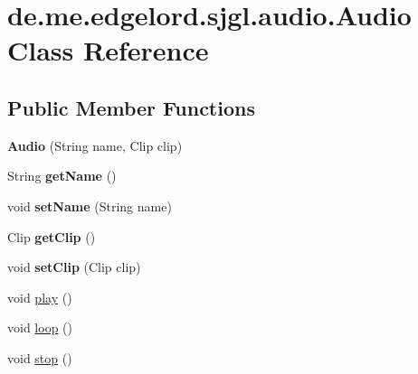 \hypertarget{classde_1_1me_1_1edgelord_1_1sjgl_1_1audio_1_1_audio}{}\section{de.\+me.\+edgelord.\+sjgl.\+audio.\+Audio Class Reference}
\label{classde_1_1me_1_1edgelord_1_1sjgl_1_1audio_1_1_audio}
\subsection*{Public Member Functions}
\begin{DoxyCompactItemize}
\item 
\mbox{\label{classde_1_1me_1_1edgelord_1_1sjgl_1_1audio_1_1_audio_a13ee311071d7068e5ae7997b0266a3c5}} 
{\bfseries Audio} (String name, Clip clip)
\item 
\mbox{\label{classde_1_1me_1_1edgelord_1_1sjgl_1_1audio_1_1_audio_a4b34b06bc7440c084249ae098eb8fe06}} 
String {\bfseries get\+Name} ()
\item 
\mbox{\label{classde_1_1me_1_1edgelord_1_1sjgl_1_1audio_1_1_audio_aa9b4566ab537ed67744c38887839d8a3}} 
void {\bfseries set\+Name} (String name)
\item 
\mbox{\label{classde_1_1me_1_1edgelord_1_1sjgl_1_1audio_1_1_audio_ad3571669b120139b2343b5fa7a225298}} 
Clip {\bfseries get\+Clip} ()
\item 
\mbox{\label{classde_1_1me_1_1edgelord_1_1sjgl_1_1audio_1_1_audio_aba8fc977249cf5f42d2b5df7272e081b}} 
void {\bfseries set\+Clip} (Clip clip)
\item 
void \mbox{\hyperlink{classde_1_1me_1_1edgelord_1_1sjgl_1_1audio_1_1_audio_ac87651401394ee2e141c099a175cd7cb}{play}} ()
\item 
void \mbox{\hyperlink{classde_1_1me_1_1edgelord_1_1sjgl_1_1audio_1_1_audio_a654692b8ee1f0d298af938b2c76e6a54}{loop}} ()
\item 
void \mbox{\hyperlink{classde_1_1me_1_1edgelord_1_1sjgl_1_1audio_1_1_audio_a2e9d9c2e43c4bab399c7f360c8f90ce2}{stop}} ()
\end{DoxyCompactItemize}


